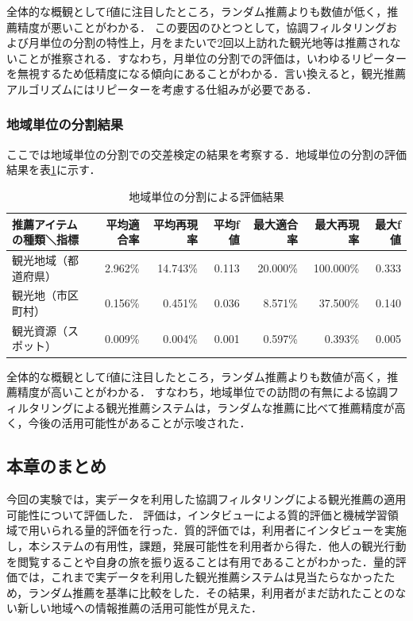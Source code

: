 \documentclass{jsarticle}
\begin{document}
全体的な概観としてf値に注目したところ，ランダム推薦よりも数値が低く，推薦精度が悪いことがわかる．
この要因のひとつとして，協調フィルタリングおよび月単位の分割の特性上，月をまたいで2回以上訪れた観光地等は推薦されないことが推察される．すなわち，月単位の分割での評価は，いわゆるリピーターを無視するため低精度になる傾向にあることがわかる．言い換えると，観光推薦アルゴリズムにはリピーターを考慮する仕組みが必要である．

\subsubsection{地域単位の分割結果}

ここでは地域単位の分割での交差検定の結果を考察する．地域単位の分割の評価結果を表\ref{result_area}に示す．

\begin{table}[!h]
\small
\caption{地域単位の分割による評価結果}
\begin{center}
\begin{tabular}{lrrrrrr}
\label{result_area}
推薦アイテムの種類＼指標            & 平均適合率 & 平均再現率 & 平均f値 & 最大適合率 & 最大再現率 & 最大f値 \\ \hline
観光地域（都道府県）    & 2.962\% & 14.743\% & 0.113 & 20.000\% & 100.000\% & 0.333 \\
観光地（市区町村）      & 0.156\% &  0.451\% & 0.036 &  8.571\% &  37.500\% & 0.140 \\
観光資源（スポット）    & 0.009\% &  0.004\% & 0.001 &  0.597\% &   0.393\% & 0.005 \\
\end{tabular}
\end{center}
\end{table}

全体的な概観としてf値に注目したところ，ランダム推薦よりも数値が高く，推薦精度が高いことがわかる．
すなわち，地域単位での訪問の有無による協調フィルタリングによる観光推薦システムは，ランダムな推薦に比べて推薦精度が高く，今後の活用可能性があることが示唆された．

\subsection{本章のまとめ}

今回の実験では，実データを利用した協調フィルタリングによる観光推薦の適用可能性について評価した．
評価は，インタビューによる質的評価と機械学習領域で用いられる量的評価を行った．質的評価では，利用者にインタビューを実施し，本システムの有用性，課題，発展可能性を利用者から得た．他人の観光行動を閲覧することや自身の旅を振り返ることは有用であることがわかった．量的評価では，これまで実データを利用した観光推薦システムは見当たらなかったため，ランダム推薦を基準に比較をした．その結果，利用者がまだ訪れたことのない新しい地域への情報推薦の活用可能性が見えた．
\end{document}
